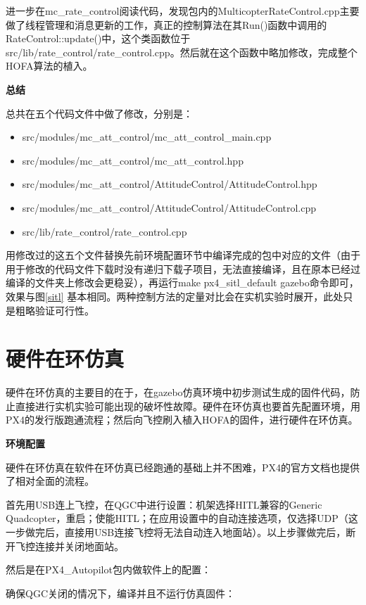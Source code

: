 进一步在mc\_rate\_control阅读代码，发现包内的MulticopterRateControl.cpp主要做了线程管理和消息更新的工作，真正的控制算法在其Run()函数中调用的RateControl::update()中，这个类函数位于src/lib/rate\_control/rate\_control.cpp。然后就在这个函数中略加修改，完成整个HOFA算法的植入。

\textbf{总结}

总共在五个代码文件中做了修改，分别是：
\begin{itemize}
  \item src/modules/mc\_att\_control/mc\_att\_control\_main.cpp
  \item src/modules/mc\_att\_control/mc\_att\_control.hpp
  \item src/modules/mc\_att\_control/AttitudeControl/AttitudeControl.hpp
  \item src/modules/mc\_att\_control/AttitudeControl/AttitudeControl.cpp
  \item src/lib/rate\_control/rate\_control.cpp
\end{itemize}

用修改过的这五个文件替换先前环境配置环节中编译完成的包中对应的文件（由于用于修改的代码文件下载时没有递归下载子项目，无法直接编译，且在原本已经过编译的文件夹上修改会更稳妥），再运行make px4\_sitl\_default gazebo命令即可，效果与图\ref{sitl} 基本相同。两种控制方法的定量对比会在实机实验时展开，此处只是粗略验证可行性。

\section{硬件在环仿真}
硬件在环仿真的主要目的在于，在gazebo仿真环境中初步测试生成的固件代码，防止直接进行实机实验可能出现的破坏性故障。硬件在环仿真也要首先配置环境，用PX4的发行版跑通流程；然后向飞控刷入植入HOFA的固件，进行硬件在环仿真。

\textbf{环境配置}

硬件在环仿真在软件在环仿真已经跑通的基础上并不困难，PX4的官方文档也提供了相对全面的流程\cite{px4hitl}。

首先用USB连上飞控，在QGC中进行设置：机架选择HITL兼容的Generic Quadcopter，重启；使能HITL；在应用设置中的自动连接选项，仅选择UDP（这一步做完后，直接用USB连接飞控将无法自动连入地面站）。以上步骤做完后，断开飞控连接并关闭地面站。

然后是在PX4\_Autopilot包内做软件上的配置\cite{px4hitl}：

确保QGC关闭的情况下，编译并且不运行仿真固件：

